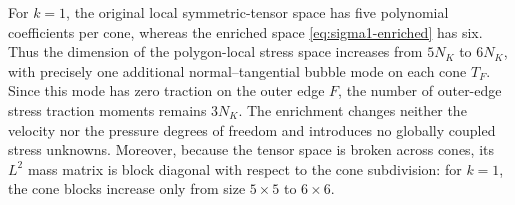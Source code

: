 \documentclass[review,hidelinks,onefignum,onetabnum]{siamart251216}
\begin{document}
\begin{remark}
For $k=1$, the original local symmetric-tensor space has five
polynomial coefficients per cone, whereas the enriched space
\eqref{eq:sigma1-enriched} has six. Thus the dimension of the
polygon-local stress space increases from $5N_K$ to $6N_K$,
with precisely one additional normal--tangential bubble mode
on each cone $T_F$. Since this mode has zero traction on the
outer edge $F$, the number of outer-edge stress traction moments
remains $3N_K$. The enrichment changes neither the velocity nor
the pressure degrees of freedom and introduces no globally
coupled stress unknowns. Moreover, because the tensor space is
broken across cones, its $L^2$ mass matrix is block diagonal
with respect to the cone subdivision: for $k=1$, the cone blocks
increase only from size $5\times5$ to $6\times6$.
\end{remark}
\end{document}
